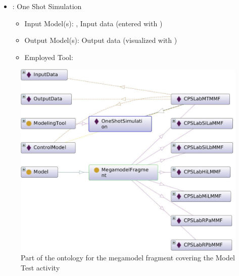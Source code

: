
\begin{itemize}
    \item {}: One Shot Simulation
    \begin{itemize}
        \item Input Model(s): \CPSLabControlModel, Input data (entered with \MATLABSimulinkSimulator)
        \item Output Model(s): Output data (visualized with \MATLABSimulinkSimulator)
        \item Employed Tool: \MATLABSimulinkSimulator %
    \end{itemize}
\end{itemize}

 


\begin{figure}[!htb]
\centering
\includegraphics[scale=0.3]{figures/CPSLabMTMMF-NEW-1.jpeg}
\caption{Part of the ontology for the megamodel fragment \CPSLabMTMMF covering the Model Test activity}
\label{fig:CPSLabMTMMF}
\end{figure}

